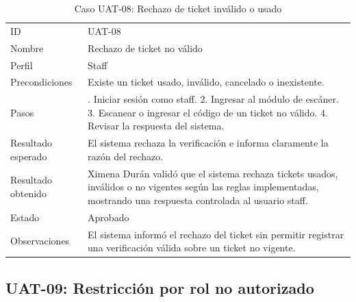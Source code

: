 \documentclass[12pt,letterpaper]{article}
\begin{document}
\begin{table}[H]
\centering
\begingroup
\footnotesize
\setlength{\tabcolsep}{3pt}
\renewcommand{\arraystretch}{1.25}

\begin{tabularx}{\textwidth}{|
>{\raggedright\arraybackslash}p{3.4cm}|
>{\raggedright\arraybackslash}X|}
\hline
\multicolumn{1}{|>{\centering\arraybackslash}m{3.4cm}|}{\textbf{Campo}} &
\multicolumn{1}{>{\centering\arraybackslash}m{10.8cm}|}{\textbf{Contenido}} \\
\hline
ID & UAT-08 \\
\hline
Nombre & Rechazo de ticket no válido \\
\hline
Perfil & Staff \\
\hline
Precondiciones & Existe un ticket usado, inválido, cancelado o inexistente. \\
\hline
Pasos & 1. Iniciar sesión como staff. 2. Ingresar al módulo de escáner. 3. Escanear o ingresar el código de un ticket no válido. 4. Revisar la respuesta del sistema. \\
\hline
Resultado esperado & El sistema rechaza la verificación e informa claramente la razón del rechazo. \\
\hline
Resultado obtenido & Ximena Durán validó que el sistema rechaza tickets usados, inválidos o no vigentes según las reglas implementadas, mostrando una respuesta controlada al usuario staff. \\
\hline
Estado & Aprobado \\
\hline
Observaciones & El sistema informó el rechazo del ticket sin permitir registrar una verificación válida sobre un ticket no vigente. \\
\hline
\end{tabularx}

\endgroup
\caption{Caso UAT-08: Rechazo de ticket inválido o usado}
\label{tab:uat-08-rechazo-ticket}
\end{table}

\subsection{UAT-09: Restricción por rol no autorizado}
\end{document}
